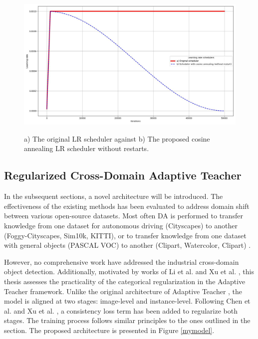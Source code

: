 \begin{figure}[htb]
	\begin{center}
		\includegraphics[width=14cm]{./LR.jpg}
	\end{center}
	\caption{a) The original LR scheduler against b) The proposed cosine annealing LR scheduler without restarts.}
	\begin{center}
		\label{annealing}
	\end{center}
\end{figure}
\FloatBarrier

\subsection{Regularized Cross-Domain Adaptive Teacher}
\label{mainExperiments} 
In the subsequent sections, a novel architecture will be introduced. The effectiveness of the existing methods has been evaluated to address domain shift  between various open-source datasets. Most often DA is performed to transfer knowledge from one dataset for autonomous driving (Cityscapes) to another (Foggy-Cityscapes, Sim10k, KITTI), or to transfer knowledge from one dataset with general objects (PASCAL VOC) to another (Clipart, Watercolor, Clipart) \cite{Oza2021}.  

However, no comprehensive work have addressed the industrial cross-domain object detection. Additionally, motivated by works of Li et al. \cite{Li2021} and Xu et al. \cite{Xu2020}, this thesis assesses the practicality of the categorical regularization in the Adaptive Teacher framework. Unlike the original architecture of Adaptive Teacher \cite{Li2021}, the model is aligned at two stages:  image-level and instance-level. Following Chen et al. \cite{Chen2018} and Xu et al. \cite{Xu2020}, a consistency loss term has been added to regularize both stages. The training process follows similar principles to the ones outlined in the  section. The proposed architecture is presented in Figure \ref{mymodel}. 

